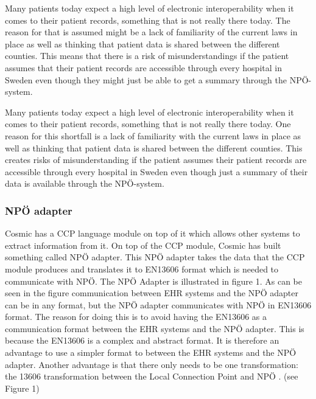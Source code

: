 \documentclass[14pt]{article}
\begin{document}
Many patients today expect a high level of electronic \gls{interoperability} when it comes to their patient records\cite{EPJ2}, something that is not really there today. The reason for that is assumed might be a lack of familiarity of the current laws in place as well as thinking that patient data is shared between the different counties. This means that there is a risk of misunderstandings if the patient assumes that their patient records are accessible through every hospital in Sweden even though they might just be able to get a summary through the NPÖ-system.

Many patients today expect a high level of electronic \gls{interoperability} when it comes to their patient records\cite{EPJ2}, something that is not really there today. One reason for this shortfall is a lack of familiarity with the current laws in place as well as thinking that patient data is shared between the different counties. This creates risks of misunderstanding if the patient assumes their patient records are accessible through every hospital in Sweden even though just a summary of their data is available through the NPÖ-system.

\subsubsection{NPÖ adapter}


Cosmic has a CCP language module on top of it which allows other systems to extract information from it. On top of the CCP module, Cosmic has built something called NPÖ adapter. This NPÖ adapter takes the data that the CCP module produces and translates it to \gls{EN13606} format which is needed to communicate with NPÖ. The NPÖ Adapter is illustrated in figure 1. As can be seen in the figure communication between \gls{EHR} systems and the NPÖ adapter can be in any format, but the NPÖ adapter communicates with NPÖ in \gls{EN13606} format. The reason for doing this is to avoid having the \gls{EN13606} as a communication format between the \gls{EHR} systems and the NPÖ adapter. This is because the \gls{EN13606} is a complex and abstract format. It is therefore an advantage to use a simpler format to between the \gls{EHR} systems and the NPÖ adapter. Another advantage is that there only needs to be one transformation: the 13606 transformation between the Local Connection Point and NPÖ  \cite{ViktorJernelov}. (see Figure 1) 
\end{document}
